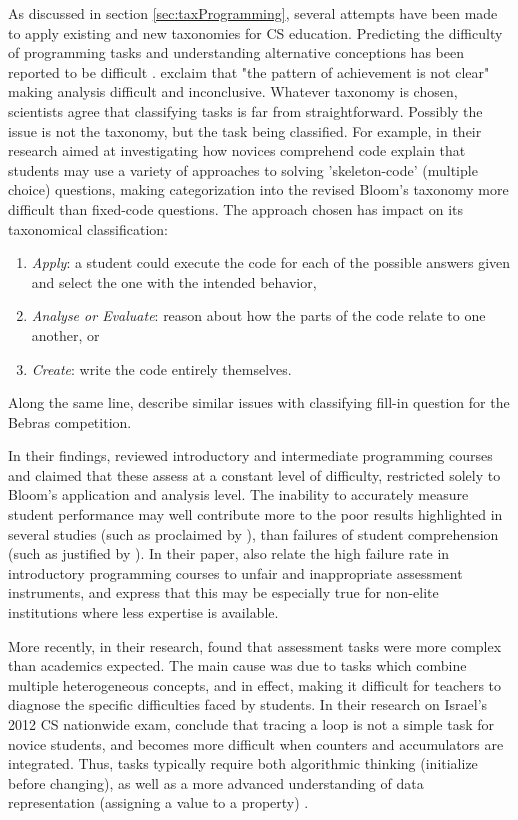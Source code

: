 As discussed in section \ref{sec:taxProgramming}, several attempts have been made to apply existing and new taxonomies for CS education. Predicting the difficulty of programming tasks and understanding alternative conceptions has been reported to be difficult \cite{Lonati2017Bebras}. \cite{zur-burgury2013israelExam} exclaim that "the pattern of achievement is not clear" making analysis difficult and inconclusive. Whatever taxonomy is chosen, scientists agree that classifying tasks is far from straightforward. Possibly the issue is not the taxonomy, but the task being classified. For example, in their research aimed at investigating how novices comprehend code  explain that students may use a variety of approaches to solving 'skeleton-code' (multiple choice) questions, making categorization into the revised Bloom's taxonomy more difficult than fixed-code questions. The approach chosen has impact on its taxonomical classification:
\begin{enumerate}
\item \emph{Apply}: a student could execute the code for each of the possible answers given and select the one with the intended behavior,
\item \emph{Analyse or Evaluate}: reason about how the parts of the code relate to one another, or
\item \emph{Create}: write the code entirely themselves.
\end{enumerate}
Along the same line,  describe similar issues with classifying fill-in question for the Bebras competition.


In their findings,  reviewed introductory and intermediate programming courses and claimed that these assess at a constant level of difficulty, restricted solely to Bloom's application and analysis level. The inability to accurately measure student performance may well contribute more to the poor results highlighted in several studies (such as proclaimed by ), than failures of student comprehension (such as justified by \cite{2010TewGuzdial}). In their paper,  also relate the high failure rate in introductory programming courses to unfair and inappropriate assessment instruments, and express that this may be especially true for non-elite institutions where less expertise is available.


More recently, in their research,  found that assessment tasks were more complex than academics expected. The main cause was due to tasks which combine multiple heterogeneous concepts, and in effect, making it difficult for teachers to diagnose the specific difficulties faced by students. In their research on Israel's 2012 CS nationwide exam,  conclude that tracing a loop is not a simple task for novice students, and becomes more difficult when counters and accumulators are integrated. Thus, tasks typically require both algorithmic thinking (initialize before changing), as well as a more advanced understanding of data representation (assigning a value to a property) \cite{Seiter2013}.


